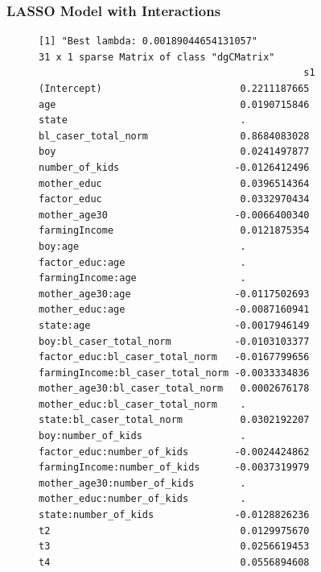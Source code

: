 \documentclass{article}
\begin{document}
\subsubsection*{LASSO Model with Interactions}
\begin{figure}[H]
\begin{lstlisting}[style=RstyleComment, caption=LASSO Model with Interactions]
[1] "Best lambda: 0.00189044654131057"
31 x 1 sparse Matrix of class "dgCMatrix"
                                              s1
(Intercept)                        0.2211187665
age                                0.0190715846
state                              .           
bl_caser_total_norm                0.8684083028
boy                                0.0241497877
number_of_kids                    -0.0126412496
mother_educ                        0.0396514364
factor_educ                        0.0332970434
mother_age30                      -0.0066400340
farmingIncome                      0.0121875354
boy:age                            .           
factor_educ:age                    .           
farmingIncome:age                  .           
mother_age30:age                  -0.0117502693
mother_educ:age                   -0.0087160941
state:age                         -0.0017946149
boy:bl_caser_total_norm           -0.0103103377
factor_educ:bl_caser_total_norm   -0.0167799656
farmingIncome:bl_caser_total_norm -0.0033334836
mother_age30:bl_caser_total_norm   0.0002676178
mother_educ:bl_caser_total_norm    .           
state:bl_caser_total_norm          0.0302192207
boy:number_of_kids                 .           
factor_educ:number_of_kids        -0.0024424862
farmingIncome:number_of_kids      -0.0037319979
mother_age30:number_of_kids        .           
mother_educ:number_of_kids         .           
state:number_of_kids              -0.0128826236
t2                                 0.0129975670
t3                                 0.0256619453
t4                                 0.0556894608
\end{lstlisting}
\end{figure}
\end{document}
